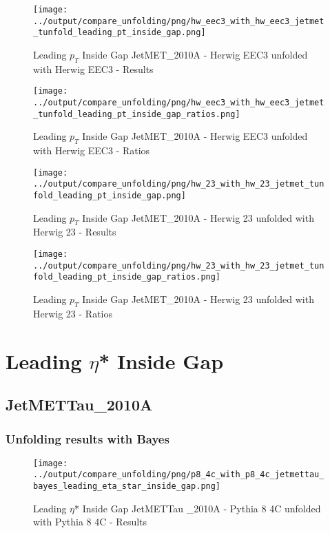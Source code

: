 \documentclass[11pt]{book}
\begin{document}
\begin{figure}[ht]
\centering
\texttt{[image: ../output/compare\_unfolding/png/hw\_eec3\_with\_hw\_eec3\_jetmet\_tunfold\_leading\_pt\_inside\_gap.png]}
\caption{Leading $p_{T}$ Inside Gap JetMET\_2010A - Herwig EEC3 unfolded with Herwig EEC3 - Results}
\label{hw_eec3_hw_eec3_jetmet_tunfold_leading_pt_inside_gap_a}
\end{figure}

\begin{figure}[ht]
\centering
\texttt{[image: ../output/compare\_unfolding/png/hw\_eec3\_with\_hw\_eec3\_jetmet\_tunfold\_leading\_pt\_inside\_gap\_ratios.png]}
\caption{Leading $p_{T}$ Inside Gap JetMET\_2010A - Herwig EEC3 unfolded with Herwig EEC3 - Ratios}
\label{hw_eec3_hw_eec3_jetmet_tunfold_leading_pt_inside_gap_b}
\end{figure}

\begin{figure}[ht]
\centering
\texttt{[image: ../output/compare\_unfolding/png/hw\_23\_with\_hw\_23\_jetmet\_tunfold\_leading\_pt\_inside\_gap.png]}
\caption{Leading $p_{T}$ Inside Gap JetMET\_2010A - Herwig 23 unfolded with Herwig 23 - Results}
\label{hw_23_hw_23_jetmet_tunfold_leading_pt_inside_gap_a}
\end{figure}

\begin{figure}[ht]
\centering
\texttt{[image: ../output/compare\_unfolding/png/hw\_23\_with\_hw\_23\_jetmet\_tunfold\_leading\_pt\_inside\_gap\_ratios.png]}
\caption{Leading $p_{T}$ Inside Gap JetMET\_2010A - Herwig 23 unfolded with Herwig 23 - Ratios}
\label{hw_23_hw_23_jetmet_tunfold_leading_pt_inside_gap_b}
\end{figure}






\newpage
\chapter{Leading $\eta$* Inside Gap}
\section{JetMETTau\_2010A}
\subsection{Unfolding results with Bayes}


\begin{figure}[ht]
\centering
\texttt{[image: ../output/compare\_unfolding/png/p8\_4c\_with\_p8\_4c\_jetmettau\_bayes\_leading\_eta\_star\_inside\_gap.png]}
\caption{Leading $\eta$* Inside Gap JetMETTau \_2010A - Pythia 8 4C unfolded with Pythia 8 4C - Results}
\label{p8_p8_jetmettau_bayes_leading_eta_star_inside_gap_a}
\end{figure}
\end{document}
